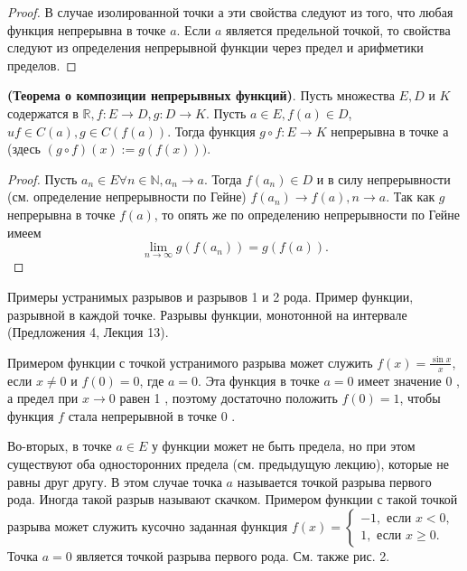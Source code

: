 \begin{proof}
    В случае изолированной точки $а$ эти свойства следуют из того, что любая функция непрерывна в точке $a$. Если $a$ является предельной точкой, то свойства следуют из определения непрерывной функции через предел и арифметики пределов.
\end{proof}

\begin{proposition}
    \textbf{(Теорема о композиции непрерывных функций)}. Пусть множества $E, D$ и $K$ содержатся в $\mathbb{R}, f: E \rightarrow D, g: D \rightarrow K$. Пусть $a \in E, f(a) \in D$, $u f \in C(a), g \in C(f(a))$. Тогда функция $g \circ f: E \rightarrow K$ непрерывна в точке а (здесь $(g \circ f)(x):=g(f(x)))$.
\end{proposition}

\begin{proof}
    Пусть $a_n \in E \forall n \in \mathbb{N}, a_n \rightarrow a$. Тогда $f\left(a_n\right) \in D$ и в силу непрерывности (см. определение непрерывности по Гейне) $f\left(a_n\right) \rightarrow f(a), n \rightarrow a$. Так как $g$ непрерывна в точке $f(a)$, то опять же по определению непрерывности по Гейне имеем
    $$
        \lim _{n \rightarrow \infty} g\left(f\left(a_n\right)\right)=g(f(a)) .
    $$
\end{proof}

\newpage
\begin{problem}
Примеры устранимых разрывов и разрывов 1 и 2 рода. Пример функции, разрывной в
каждой точке. Разрывы функции, монотонной на интервале (Предложения 4, Лекция 13).
\end{problem}
Примером функции с точкой устранимого разрыва может служить $f(x)=\frac{\sin x}{x}$, если $x \neq 0$ и $f(0)=0$, где $a=0$. Эта функция в точке $a=0$ имеет значение 0 , а предел при $x \rightarrow 0$ равен 1 , поэтому достаточно положить $f(0)=1$, чтобы функция $f$ стала непрерывной в точке 0 .

Во-вторых, в точке $a \in E$ у функции может не быть предела, но при этом существуют оба односторонних предела (см. предыдущую лекцию), которые не равны друг другу. В этом случае точка $a$ называется точкой разрыва первого рода. Иногда такой разрыв называют скачком. Примером функции с такой точкой разрыва может служить кусочно заданная функция $f(x)=\left\{\begin{array}{l}-1, \text { если } x<0, \\ 1, \text { если } x \geq 0 .\end{array}\right.$ Точка $a=0$ является точкой разрыва первого рода. См. также рис. 2.

